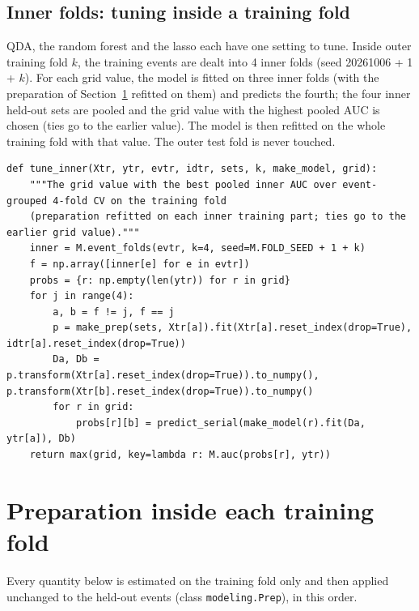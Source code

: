 \documentclass[11pt]{article}
\begin{document}
\subsection{Inner folds: tuning inside a training fold}

QDA, the random forest and the lasso each have one setting to tune. Inside outer training fold $k$, the training events are dealt into 4 inner folds (seed 20261006 + 1 + $k$). For each grid value, the model is fitted on three inner folds (with the preparation of Section~\ref{sec:prep} refitted on them) and predicts the fourth; the four inner held-out sets are pooled and the grid value with the highest pooled AUC is chosen (ties go to the earlier value). The model is then refitted on the whole training fold with that value. The outer test fold is never touched.

\begin{lstlisting}[caption={Inner tuning by pooled AUC (scripts/part1\_models.py)}]
def tune_inner(Xtr, ytr, evtr, idtr, sets, k, make_model, grid):
    """The grid value with the best pooled inner AUC over event-grouped 4-fold CV on the training fold
    (preparation refitted on each inner training part; ties go to the earlier grid value)."""
    inner = M.event_folds(evtr, k=4, seed=M.FOLD_SEED + 1 + k)
    f = np.array([inner[e] for e in evtr])
    probs = {r: np.empty(len(ytr)) for r in grid}
    for j in range(4):
        a, b = f != j, f == j
        p = make_prep(sets, Xtr[a]).fit(Xtr[a].reset_index(drop=True), idtr[a].reset_index(drop=True))
        Da, Db = p.transform(Xtr[a].reset_index(drop=True)).to_numpy(), p.transform(Xtr[b].reset_index(drop=True)).to_numpy()
        for r in grid:
            probs[r][b] = predict_serial(make_model(r).fit(Da, ytr[a]), Db)
    return max(grid, key=lambda r: M.auc(probs[r], ytr))
\end{lstlisting}

\section{Preparation inside each training fold}\label{sec:prep}

Every quantity below is estimated on the training fold only and then applied unchanged to the held-out events (class \texttt{modeling.Prep}), in this order.
\end{document}

